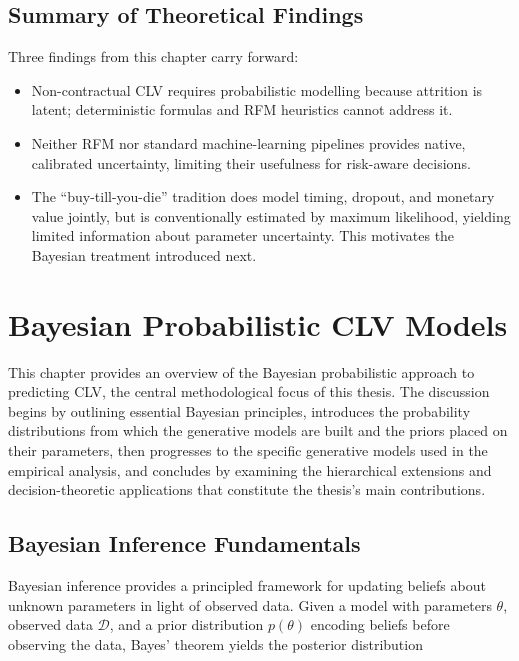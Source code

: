 \documentclass[12pt, a4paper, oneside]{report}
\begin{document}
\section{Summary of Theoretical Findings}
\label{sec:ch2-summary}

Three findings from this chapter carry forward:

\begin{itemize}
  \item Non-contractual CLV requires probabilistic modelling because attrition is latent; deterministic formulas and RFM heuristics cannot address it.
  \item Neither RFM nor standard machine-learning pipelines provides native, calibrated uncertainty, limiting their usefulness for risk-aware decisions.
  \item The ``buy-till-you-die'' tradition does model timing, dropout, and monetary value jointly, but is conventionally estimated by maximum likelihood, yielding limited information about parameter uncertainty. This motivates the Bayesian treatment introduced next.
\end{itemize}

\chapter{Bayesian Probabilistic CLV Models}
\label{ch:bayesian}

This chapter provides an overview of the Bayesian probabilistic approach to predicting CLV, the central methodological focus of this thesis. The discussion begins by outlining essential Bayesian principles, introduces the probability distributions from which the generative models are built and the priors placed on their parameters, then progresses to the specific generative models used in the empirical analysis, and concludes by examining the hierarchical extensions and decision-theoretic applications that constitute the thesis's main contributions.

\section{Bayesian Inference Fundamentals}
\label{sec:bayes-fundamentals}

Bayesian inference provides a principled framework for updating beliefs about unknown parameters in light of observed data. Given a model with parameters $\theta$, observed data $\mathcal{D}$, and a prior distribution $p(\theta)$ encoding beliefs before observing the data, Bayes' theorem yields the posterior distribution
\end{document}
